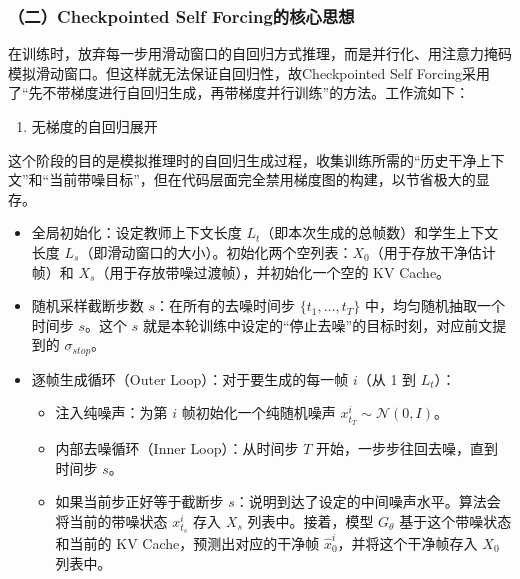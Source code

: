\hypertarget{ux4e8ccheckpointed-self-forcingux7684ux6838ux5fc3ux601dux60f3}{%
\subsubsection{（二）Checkpointed Self Forcing的核心思想}\label{ux4e8ccheckpointed-self-forcingux7684ux6838ux5fc3ux601dux60f3}}

在训练时，放弃每一步用滑动窗口的自回归方式推理，而是并行化、用注意力掩码模拟滑动窗口。但这样就无法保证自回归性，故Checkpointed Self Forcing采用了``先不带梯度进行自回归生成，再带梯度并行训练''的方法。工作流如下：

\begin{enumerate}
\def\labelenumi{\arabic{enumi}.}
\tightlist
\item
  无梯度的自回归展开
\end{enumerate}

这个阶段的目的是模拟推理时的自回归生成过程，收集训练所需的``历史干净上下文''和``当前带噪目标''，但在代码层面完全禁用梯度图的构建，以节省极大的显存。

\begin{itemize}
\tightlist
\item
  全局初始化：设定教师上下文长度 \(L_t\)（即本次生成的总帧数）和学生上下文长度 \(L_s\)（即滑动窗口的大小）。初始化两个空列表：\(X_0\)（用于存放干净估计帧）和 \(X_s\)（用于存放带噪过渡帧），并初始化一个空的 KV Cache。
\item
  随机采样截断步数 \(s\)：在所有的去噪时间步 \(\{t_1,\ldots,t_T\}\) 中，均匀随机抽取一个时间步 \(s\)。这个 \(s\) 就是本轮训练中设定的``停止去噪''的目标时刻，对应前文提到的 \(\sigma_{stop}\)。
\item
  逐帧生成循环（Outer Loop）：对于要生成的每一帧 \(i\)（从 1 到 \(L_t\)）：

  \begin{itemize}
  \tightlist
  \item
    注入纯噪声：为第 \(i\) 帧初始化一个纯随机噪声 \(x_{t_T}^{i}\sim\mathcal{N}(0,I)\)。
  \item
    内部去噪循环（Inner Loop）：从时间步 \(T\) 开始，一步步往回去噪，直到时间步 \(s\)。
  \item
    如果当前步正好等于截断步 \(s\)：说明到达了设定的中间噪声水平。算法会将当前的带噪状态 \(x_{t_s}^{i}\) 存入 \(X_s\) 列表中。接着，模型 \(G_\theta\) 基于这个带噪状态和当前的 KV Cache，预测出对应的干净帧 \(\hat{x}_0^i\)，并将这个干净帧存入 \(X_0\) 列表中。
  \end{itemize}
\end{itemize}

